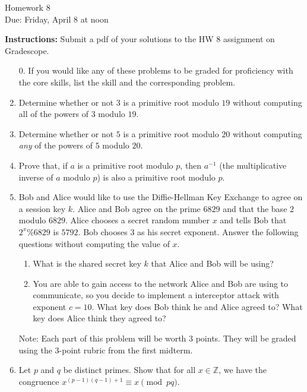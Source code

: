 \documentclass[12pt]{article}
\begin{document}
\begin{center}
{\Large Homework 8}\\
Due: Friday,  April 8 at noon\\


\end{center}
{\bf Instructions:} Submit a pdf of your solutions to the HW 8 assignment on Gradescope. 



\begin{enumerate}
\item[0.] If you would like any of these problems to be graded for proficiency with the core skills, list the skill and the corresponding problem. 

\item Determine whether or not $3$ is a primitive root modulo $19$ without computing all of the powers of $3$ modulo $19$. 
\item Determine whether or not $5$ is a primitive root modulo $20$ without computing \emph{any} of the powers of $5$ modulo $20$. 

\item Prove that, if $a$ is a primitive root modulo $p$, then $a^{-1}$ (the multiplicative inverse of $a$ modulo $p$) is also a primitive root modulo $p$. 

\item Bob and Alice would like to use the Diffie-Hellman Key Exchange to agree on a session key $k$. Alice and Bob agree on the prime $6829$ and that the base $2$ modulo $6829$. Alice chooses a secret random number $x$ and tells Bob that $2^x\%6829$ is $5792$. Bob chooses $3$ as his secret exponent.  Answer the following questions without computing the value of $x$. 
\begin{enumerate}
\item What is the shared secret key $k$ that Alice and Bob will be using?
\item You are able to gain access to the network Alice and Bob are using to communicate, so you decide to implement a interceptor attack with exponent $c=10$. What key does Bob think he and Alice agreed to? What key does Alice think they agreed to?
\end{enumerate}	
Note: Each part of this problem will be worth 3 points. They will be graded using the 3-point rubric from the first midterm. 

\item Let $p$ and $q$ be distinct primes.  Show that for all $x \in \mathbb{Z}$, we have the congruence $x^{(p-1)(q-1)+1} \equiv x \pmod{pq}$.  

\end{enumerate}
\end{document}

